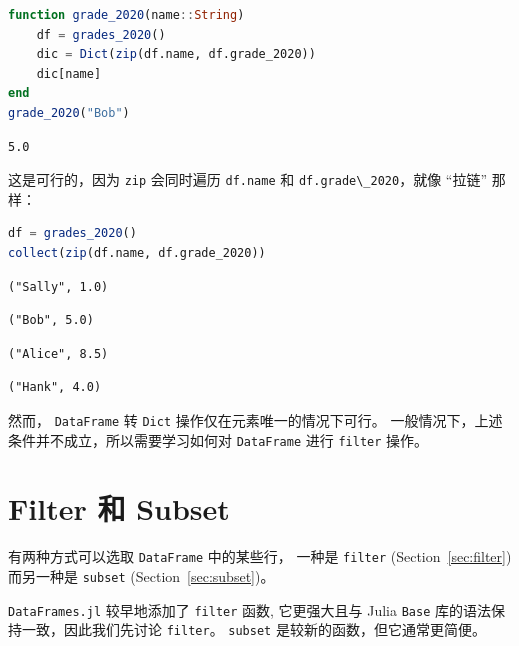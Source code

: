 \documentclass[
  notoc %
]{tufte-book}
\newcommand{\passthrough}[1]{#1}
\begin{document}
\begin{lstlisting}[language=Julia]
function grade_2020(name::String)
    df = grades_2020()
    dic = Dict(zip(df.name, df.grade_2020))
    dic[name]
end
grade_2020("Bob")
\end{lstlisting}

\begin{lstlisting}[language=Output]
5.0
\end{lstlisting}

这是可行的，因为 \passthrough{\lstinline!zip!} 会同时遍历
\passthrough{\lstinline!df.name!} 和
\passthrough{\lstinline!df.grade\_2020!}，就像 ``拉链'' 那样：

\begin{lstlisting}[language=Julia]
df = grades_2020()
collect(zip(df.name, df.grade_2020))
\end{lstlisting}

\begin{lstlisting}[language=Output]
("Sally", 1.0)
\end{lstlisting}

\begin{lstlisting}[language=Output]
("Bob", 5.0)
\end{lstlisting}

\begin{lstlisting}[language=Output]
("Alice", 8.5)
\end{lstlisting}

\begin{lstlisting}[language=Output]
("Hank", 4.0)
\end{lstlisting}

然而， \passthrough{\lstinline!DataFrame!} 转
\passthrough{\lstinline!Dict!} 操作仅在元素唯一的情况下可行。
一般情况下，上述条件并不成立，所以需要学习如何对
\passthrough{\lstinline!DataFrame!} 进行
\passthrough{\lstinline!filter!} 操作。

\hypertarget{sec:filter_subset}{%
\section{Filter 和 Subset}\label{sec:filter_subset}}

有两种方式可以选取 \passthrough{\lstinline!DataFrame!} 中的某些行，
一种是 \passthrough{\lstinline!filter!} (Section~\ref{sec:filter})
而另一种是 \passthrough{\lstinline!subset!} (Section~\ref{sec:subset})。

\passthrough{\lstinline!DataFrames.jl!} 较早地添加了
\passthrough{\lstinline!filter!} 函数, 它更强大且与 Julia
\passthrough{\lstinline!Base!} 库的语法保持一致，因此我们先讨论
\passthrough{\lstinline!filter!}。 \passthrough{\lstinline!subset!}
是较新的函数，但它通常更简便。
\end{document}
